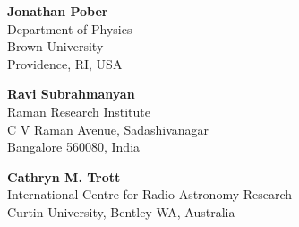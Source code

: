 {\noindent\textbf{Jonathan Pober}\\
Department of Physics\\
Brown University\\
Providence, RI, USA

\noindent\textbf{Ravi Subrahmanyan}\\
Raman Research Institute\\
C V Raman Avenue, Sadashivanagar\\
Bangalore 560080, India

\noindent\textbf{Cathryn M. Trott}\\
International Centre for Radio Astronomy Research\\
Curtin University, Bentley WA, Australia

}

